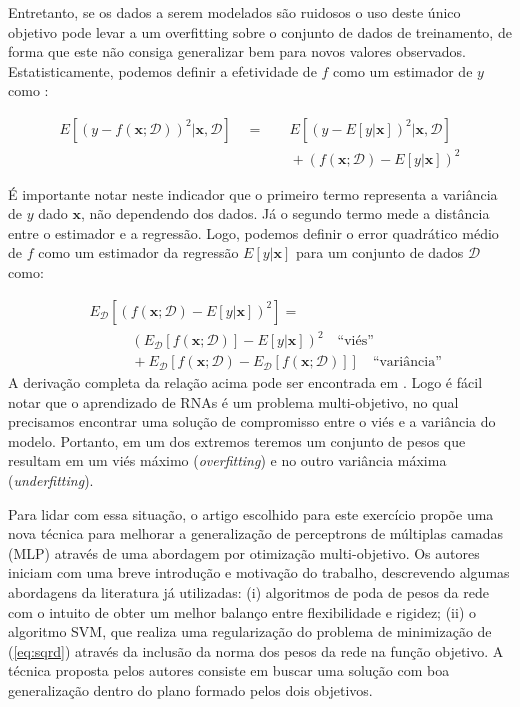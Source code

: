 \documentclass[peerreview]{IEEEtran}
\begin{document}
	Entretanto, se os dados a serem modelados são ruidosos o uso deste único objetivo pode levar a um overfitting sobre o conjunto de dados de treinamento, de forma que este não consiga generalizar bem para novos valores observados. Estatisticamente, podemos definir a efetividade de $f$ como um estimador de $y$ como \cite{biasvardil}:
	
	\begin{equation}
		\begin{aligned}
			E[(y - f(\mathbf{x}; \mathcal{D}))^2 | \mathbf{x}, \mathcal{D}] \quad = & \quad E\left[ (y - E \left[ y | \mathbf{x}\right] )^2 | \mathbf{x}, \mathcal{D}\right]   \\
			 & \quad + (f(\mathbf{x};\mathcal{D}) - E[y|\mathbf{x}])^2
		\end{aligned}
	\end{equation}
	
	É importante notar neste indicador que o primeiro termo representa a variância de $y$ dado $\mathbf{x}$, não dependendo dos dados. Já o segundo termo mede a distância entre o estimador e a regressão. Logo, podemos definir o error quadrático médio de $f$ como um estimador da regressão $E[y|\mathbf{x}]$ para um conjunto de dados $\mathcal{D}$ como:
	
	\begin{equation}
		\begin{aligned}
			& E_{\mathcal{D}}[(f(\mathbf{x};\mathcal{D}) - E[y|\mathbf{x}])^2] = \\ 
			& \qquad \quad (E_{\mathcal{D}}[f(\mathbf{x}; \mathcal{D})] - E[y|\mathbf{x}])^2 \quad \text{``viés''} \\
			& \qquad \quad  + E_{\mathcal{D}}\left[ f(\mathbf{x};\mathcal{D}) - E_{\mathcal{D}}[f(\mathbf{x};\mathcal{D})]\right]   \quad \text{``variância''}
		\end{aligned}
	\end{equation}
	A derivação completa da relação acima pode ser encontrada em \cite{biasvardil}. Logo é fácil notar que o aprendizado de RNAs é um problema multi-objetivo, no qual precisamos encontrar uma solução de compromisso entre o viés e a variância do modelo. Portanto, em um dos extremos teremos um conjunto de pesos que resultam em um viés máximo (\textit{overfitting}) e no outro variância máxima (\textit{underfitting}).
	
	Para lidar com essa situação, o artigo escolhido para este exercício propõe uma nova técnica para melhorar a generalização de perceptrons de múltiplas camadas (MLP) através de uma abordagem por otimização multi-objetivo. Os autores iniciam com uma breve introdução e motivação do trabalho, descrevendo algumas abordagens da literatura já utilizadas: (i) algoritmos de poda de pesos da rede com o intuito de obter um melhor balanço entre flexibilidade e rigidez; (ii) o algoritmo SVM, que realiza uma regularização do problema de minimização de (\ref{eq:sqrd}) através da inclusão da norma dos pesos da rede na função objetivo. A técnica proposta pelos autores consiste em buscar uma solução com boa generalização dentro do plano formado pelos dois objetivos. 
	
\end{document}
